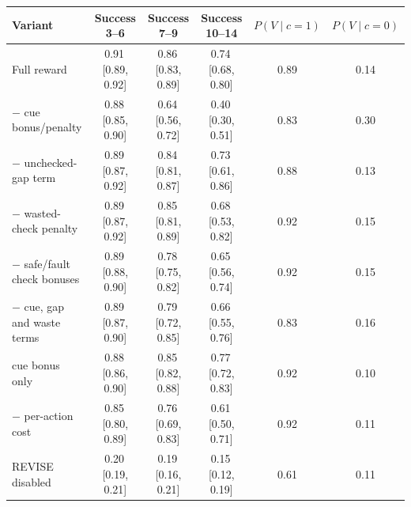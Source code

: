 \begin{tabular}{lccccc}
\toprule
Variant & Success 3--6 & Success 7--9 & Success 10--14 & $P(V\mid c{=}1)$ & $P(V\mid c{=}0)$ \\
\midrule
Full reward & 0.91\,{\scriptsize[0.89, 0.92]} & 0.86\,{\scriptsize[0.83, 0.89]} & 0.74\,{\scriptsize[0.68, 0.80]} & 0.89 & 0.14 \\
$-$ cue bonus/penalty & 0.88\,{\scriptsize[0.85, 0.90]} & 0.64\,{\scriptsize[0.56, 0.72]} & 0.40\,{\scriptsize[0.30, 0.51]} & 0.83 & 0.30 \\
$-$ unchecked-gap term & 0.89\,{\scriptsize[0.87, 0.92]} & 0.84\,{\scriptsize[0.81, 0.87]} & 0.73\,{\scriptsize[0.61, 0.86]} & 0.88 & 0.13 \\
$-$ wasted-check penalty & 0.89\,{\scriptsize[0.87, 0.92]} & 0.85\,{\scriptsize[0.81, 0.89]} & 0.68\,{\scriptsize[0.53, 0.82]} & 0.92 & 0.15 \\
$-$ safe/fault check bonuses & 0.89\,{\scriptsize[0.88, 0.90]} & 0.78\,{\scriptsize[0.75, 0.82]} & 0.65\,{\scriptsize[0.56, 0.74]} & 0.92 & 0.15 \\
$-$ cue, gap and waste terms & 0.89\,{\scriptsize[0.87, 0.90]} & 0.79\,{\scriptsize[0.72, 0.85]} & 0.66\,{\scriptsize[0.55, 0.76]} & 0.83 & 0.16 \\
cue bonus only & 0.88\,{\scriptsize[0.86, 0.90]} & 0.85\,{\scriptsize[0.82, 0.88]} & 0.77\,{\scriptsize[0.72, 0.83]} & 0.92 & 0.10 \\
$-$ per-action cost & 0.85\,{\scriptsize[0.80, 0.89]} & 0.76\,{\scriptsize[0.69, 0.83]} & 0.61\,{\scriptsize[0.50, 0.71]} & 0.92 & 0.11 \\
REVISE disabled & 0.20\,{\scriptsize[0.19, 0.21]} & 0.19\,{\scriptsize[0.16, 0.21]} & 0.15\,{\scriptsize[0.12, 0.19]} & 0.61 & 0.11 \\
\bottomrule
\end{tabular}
